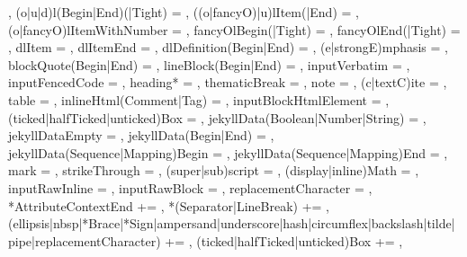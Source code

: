 {{    },
  (o|u|d)l(Begin|End)(|Tight) = {%
    },
  ((o|fancyO)|u)lItem(|End) = {%
    },
  (o|fancyO)lItemWithNumber = {%
    },
  fancyOlBegin(|Tight) = {%
    },
  fancyOlEnd(|Tight) = {%
    },
  dlItem = {%
    },
  dlItemEnd = {%
    },
  dlDefinition(Begin|End) = {%
    },
  (e|strongE)mphasis = {%
    },
  blockQuote(Begin|End) = {%
    },
  lineBlock(Begin|End) = {%
    },
  inputVerbatim = {%
    },
  inputFencedCode = {%
    },
  heading* = {%
    },
  thematicBreak = {%
    },
  note = {%
    },
  (c|textC)ite = {%
    },
  table = {%
    },
  inlineHtml(Comment|Tag) = {%
    },
  inputBlockHtmlElement = {%
    },
  (ticked|halfTicked|unticked)Box = {%
    },
  jekyllData(Boolean|Number|String) = {%
    },
  jekyllDataEmpty = {%
    },%
  jekyllData(Begin|End) = {%
    },
  jekyllData(Sequence|Mapping)Begin = {%
    },
  jekyllData(Sequence|Mapping)End = {%
    },
  mark = {%
    },
  strikeThrough = {%
    },
  (super|sub)script = {%
    },
  (display|inline)Math = {%
    },
  inputRawInline = {%
    },
  inputRawBlock = {%
    },
  replacementCharacter = {%
    },
  *AttributeContextEnd += {\GOBBLE},
  *(Separator|LineBreak) += {\GOBBLE},
  (ellipsis|nbsp|*Brace|*Sign|ampersand|underscore|hash|circumflex|backslash|tilde|pipe|replacementCharacter) += {\GOBBLE},
  (ticked|halfTicked|unticked)Box += {\GOBBLE},
}%
